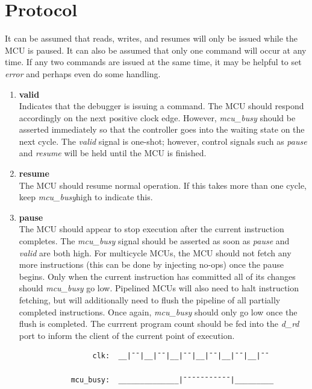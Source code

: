 \documentclass[10pt,a4paper]{article}
\begin{document}
\newpage
\section{Protocol}

It can be assumed that reads, writes, and resumes will only be issued while the MCU is paused. It
can also be assumed that only one command will occur at any time. If any two commands are issued at the
same time, it may be helpful to set \emph{error} and perhaps even do some handling.

\begin{enumerate}

    \item\textbf{valid}\\
    Indicates that the debugger is issuing a command. The MCU should respond accordingly on the next
    positive clock edge. However, \emph{mcu\_busy} should be asserted immediately so that the
    controller goes into the waiting state on the next cycle. The \emph{valid} signal is one-shot;
    however, control signals such as \emph{pause} and \emph{resume} will be held until the MCU is
    finished.

    \item\textbf{resume}\\
    The MCU should resume normal operation. If this takes more than one cycle,
    keep \emph{mcu\_busy}high to indicate this.

    \item\textbf{pause}\\
    The MCU should appear to stop execution after the current instruction completes. The
    \emph{mcu\_busy} signal should be asserted as soon as \emph{pause} and \emph{valid} are both
    high. For multicycle MCUs, the MCU should not fetch any more instructions (this can be done by
    injecting no-ops) once the pause begins. Only when the current instruction has committed
    all of its changes should \emph{mcu\_busy} go low. Pipelined MCUs will also need to halt 
    instruction fetching, but will additionally need to flush the pipeline of all partially completed
    instructions. Once again, \emph{mcu\_busy} should only go low once the flush is completed.
    The currrent program count should be fed into the \emph{d\_rd} port to inform the client of the
    current point of execution.

        \begin{verbatim}
                 clk:  __|¯¯|__|¯¯|__|¯¯|__|¯¯|__|¯¯|__|¯¯

            mcu_busy:  ______________|¯¯¯¯¯¯¯¯¯¯¯|_________


\end{verbatim}
\end{enumerate}
\end{document}

